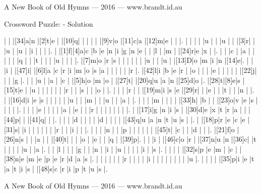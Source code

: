 \documentclass[12pt]{article}
\begin{document}
\centerline{A New Book of Old Hymns --- 2016 --- www.brandt.id.au}
\eject
\begin{center}
  \huge{Crossword Puzzle: - Solution}
\end{center}
\vspace{1.5cm}
\PuzzleSolution
\begin{Puzzle}{22}{24}
  |{}  |{}  |[34]a|n   |[2]t|e   |{}  |[10]q|{}  |{}  |{}  |{}  |{}  |[9]v|o   |[11]c|a   |[12]m|e   |{}  |{}  |.
  |{}  |{}  |{}  |{}  |u   |{}  |{}  |u   |{}  |{}  |[3]r|{}  |{}  |u   |{}  |u   |{}  |i   |{}  |{}  |{}  |.
  |{}  |[1]f|[4]a|c   |b   |e   |n   |i   |g   |n   |e   |{}  |{}  |l   |{}  |m   |{}  |[24]r|e   |x   |{}  |.
  |{}  |{}  |c   |{}  |a   |{}  |{}  |{}  |{}  |{}  |q   |{}  |{}  |t   |{}  |{}  |{}  |u   |{}  |{}  |{}  |.
  |[7]m|o   |r   |s   |{}  |{}  |{}  |{}  |{}  |{}  |u   |{}  |{}  |u   |{}  |[13]D|o   |m   |i   |n   |[14]e|.
  |{}  |{}  |i   |{}  |[47]i|{}  |[6]l|a   |c   |r   |i   |m   |o   |s   |a   |{}  |{}  |{}  |{}  |{}  |r   |.
  |[42]l|i   |b   |e   |r   |{}  |o   |{}  |{}  |{}  |e   |{}  |{}  |{}  |{}  |{}  |[22]j|{}  |{}  |{}  |g   |.
  |{}  |{}  |u   |{}  |a   |{}  |c   |{}  |[5]h|o   |m   |o   |{}  |[27]t|{}  |[20]q|u   |a   |n   |[25]d|o   |.
  |[28]t|[8]e|s   |[15]t|e   |{}  |u   |{}  |{}  |{}  |{}  |{}  |{}  |r   |{}  |{}  |s   |{}  |{}  |o   |{}  |.
  |{}  |{}  |{}  |r   |{}  |{}  |[19]m|i   |s   |e   |[29]r|{}  |{}  |e   |{}  |{}  |t   |{}  |{}  |n   |{}  |.
  |{}  |[16]d|i   |e   |s   |{}  |{}  |{}  |{}  |{}  |u   |{}  |{}  |m   |{}  |{}  |u   |{}  |{}  |a   |{}  |.
  |{}  |{}  |{}  |m   |{}  |{}  |{}  |{}  |[33]h|{}  |b   |{}  |{}  |[23]o|v   |e   |s   |{}  |{}  |{}  |{}  |.
  |{}  |{}  |{}  |e   |{}  |{}  |{}  |{}  |a   |{}  |e   |{}  |{}  |r   |{}  |{}  |{}  |{}  |{}  |{}  |{}  |.
  |{}  |[17]i|g   |n   |i   |s   |{}  |[30]d|e   |x   |t   |r   |a   |{}  |{}  |[44]p|{}  |{}  |[41]q|{}  |{}  |.
  |{}  |{}  |{}  |d   |{}  |{}  |{}  |{}  |d   |{}  |{}  |{}  |{}  |[43]q|u   |a   |n   |t   |u   |s   |{}  |.
  |{}  |[18]p|r   |e   |c   |e   |[31]s|{}  |i   |{}  |{}  |{}  |{}  |{}  |{}  |r   |{}  |{}  |i   |{}  |{}  |.
  |{}  |{}  |{}  |n   |{}  |{}  |p   |{}  |{}  |{}  |{}  |{}  |{}  |[45]t|{}  |c   |{}  |{}  |d   |{}  |{}  |.
  |[21]f|o   |[26]n|s   |{}  |{}  |a   |{}  |{}  |[40]t|{}  |{}  |{}  |o   |{}  |e   |{}  |{}  |q   |{}  |[39]p|.
  |{}  |{}  |i   |{}  |[46]c|o   |r   |{}  |[37]n|u   |n   |[36]c|{}  |t   |{}  |{}  |{}  |{}  |u   |{}  |a   |.
  |{}  |{}  |l   |{}  |{}  |{}  |g   |{}  |{}  |n   |{}  |i   |{}  |u   |{}  |{}  |{}  |{}  |i   |{}  |s   |.
  |{}  |{}  |{}  |{}  |[32]s|p   |e   |m   |{}  |c   |{}  |[38]n|e   |m   |e   |p   |e   |r   |d   |a   |s   |.
  |{}  |{}  |{}  |{}  |{}  |{}  |r   |{}  |{}  |{}  |{}  |i   |{}  |{}  |{}  |{}  |{}  |{}  |{}  |{}  |u   |.
  |{}  |{}  |{}  |{}  |[35]p|i   |e   |t   |a   |t   |i   |s   |{}  |[48]s|c   |r   |i   |p   |t   |u   |s   |.
\end{Puzzle}
\bigskip

\vfill

\centerline{A New Book of Old Hymns --- 2016 --- www.brandt.id.au}
\eject
\end{document}
